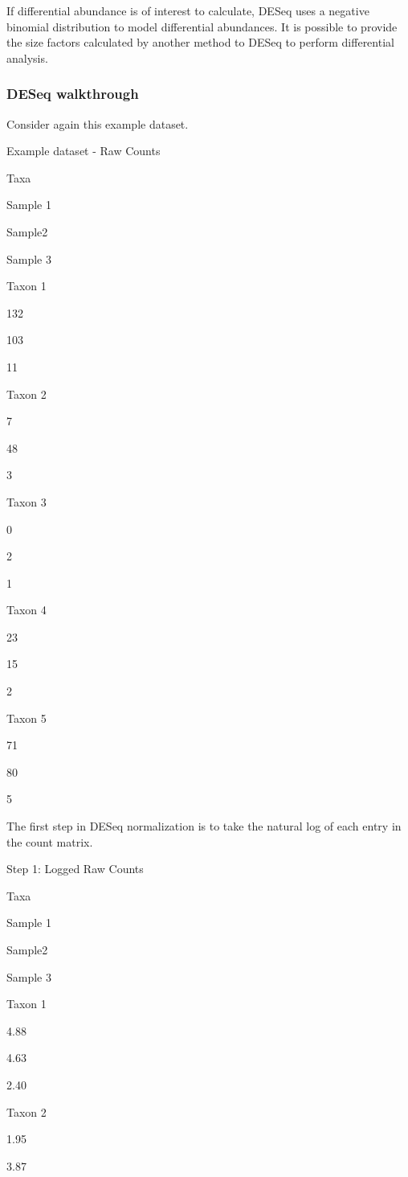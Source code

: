 \documentclass[
]{book}
\begin{document}
If differential abundance is of interest to calculate, DESeq uses a negative binomial distribution to model differential abundances. It is possible to provide the size factors calculated by another method to DESeq to perform differential analysis.

\hypertarget{deseq-walkthrough}{%
\subsubsection{DESeq walkthrough}\label{deseq-walkthrough}}

Consider again this example dataset.

\label{tab:unnamed-chunk-20}Example dataset - Raw Counts

Taxa

Sample 1

Sample2

Sample 3

Taxon 1

132

103

11

Taxon 2

7

48

3

Taxon 3

0

2

1

Taxon 4

23

15

2

Taxon 5

71

80

5

The first step in DESeq normalization is to take the natural log of each entry in the count matrix.

\label{tab:unnamed-chunk-21}Step 1: Logged Raw Counts

Taxa

Sample 1

Sample2

Sample 3

Taxon 1

4.88

4.63

2.40

Taxon 2

1.95

3.87
\end{document}
